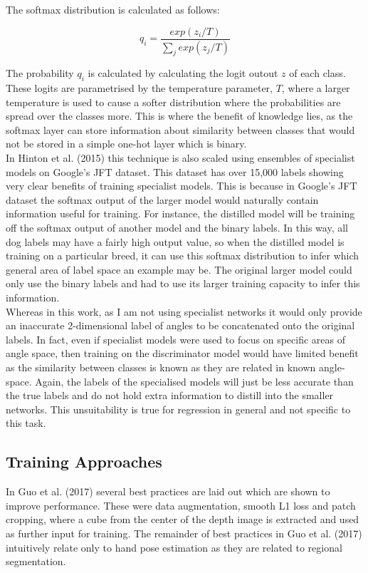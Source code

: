 \documentclass{article}
\begin{document}
The softmax distribution is calculated as follows:

\[q_i = \frac{exp(z_i/T)}{\sum_j exp(z_j/T)}\]

The probability $q_i$ is calculated by calculating the logit outout $z$ of each class. These logits are parametrised by the temperature parameter, $T$, where a larger temperature is used to cause a softer distribution where the probabilities are spread over the classes more. This is where the benefit of knowledge lies, as the softmax layer can store information about similarity between classes that would not be stored in a simple one-hot layer which is binary.\\

In Hinton et al. (2015) this technique is also scaled using ensembles of specialist models on Google's JFT dataset. This dataset has over 15,000 labels showing very clear benefits of training specialist models. This is because in Google's JFT dataset the softmax output of the larger model would naturally contain information useful for training. For instance, the distilled model will be training off the softmax output of another model and the binary labels. In this way, all dog labels may have a fairly high output value, so when the distilled model is training on a particular breed, it can use this softmax distribution to infer which general area of label space an example may be. The original larger model could only use the binary labels and had to use its larger training capacity to infer this information. \\

Whereas in this work, as I am not using specialist networks it would only provide an inaccurate 2-dimensional label of angles to be concatenated onto the original labels. In fact, even if specialist models were used to focus on specific areas of angle space, then training on the discriminator model would have limited benefit as the similarity between classes is known as they are related in known angle-space.  Again, the labels of the specialised models will just be less accurate than the true labels and do not hold extra information to distill into the smaller networks. This unsuitability is true for regression in general and not specific to this task. \\

\subsection{Training Approaches}
In Guo et al. (2017) several best practices are laid out which are shown to improve performance. These were data augmentation, smooth L1 loss and patch cropping, where a cube from the center of the depth image is extracted and used as further input for training. The remainder of best practices in Guo et al. (2017) intuitively relate only to hand pose estimation as they are related to regional segmentation. \\
\end{document}

